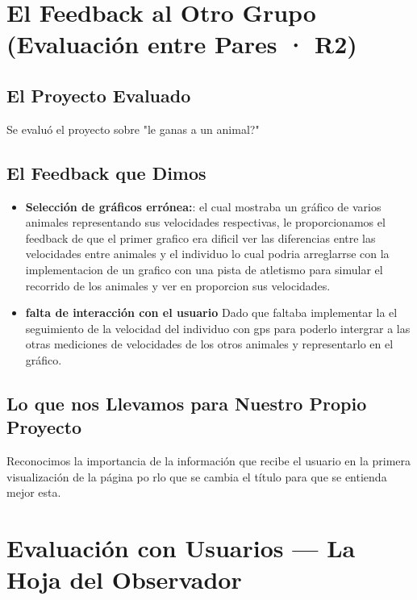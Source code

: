 \documentclass[11pt,a4paper]{article}
\begin{document}
	\section{El Feedback al Otro Grupo (Evaluación entre Pares · R2)}
	
	\subsection{El Proyecto Evaluado}
	Se evaluó el proyecto sobre "le ganas a un animal?"
	
	\subsection{El Feedback que Dimos}
	\begin{itemize}
		\item \textbf{Selección de gráficos errónea:}: el cual mostraba un gráfico de varios animales representando sus velocidades respectivas, le proporcionamos el feedback de que el primer grafico era dificil ver las diferencias entre las velocidades entre animales y el individuo lo cual podria arreglarrse con la implementacion de un grafico con una pista de atletismo para simular el recorrido de los animales y ver en proporcion sus velocidades.
        \item \textbf{falta de interacción con el usuario} Dado que faltaba implementar la el seguimiento de la velocidad del individuo con gps para poderlo intergrar a las otras mediciones de velocidades de los otros animales y representarlo en el gráfico.
	\end{itemize}
	
	\subsection{Lo que nos Llevamos para Nuestro Propio Proyecto}
	Reconocimos la importancia de la información que recibe el usuario en la primera visualización de la página po rlo que se cambia el título para que se entienda mejor esta.
	
	\vspace{0.4cm}
	
	\section{Evaluación con Usuarios — La Hoja del Observador}
	
\end{document}
